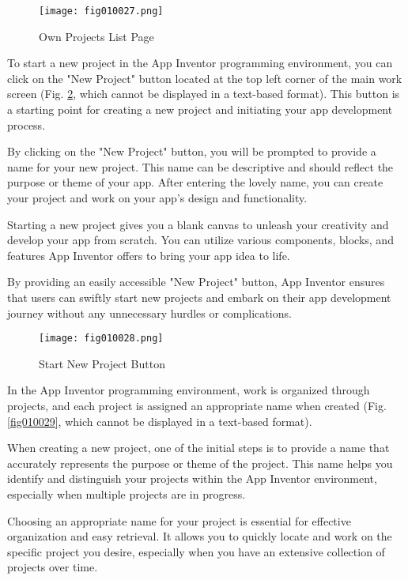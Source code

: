 \begin{figure}[H]
   \centering
   \texttt{[image: fig010027.png]}
   \caption{Own Projects List Page}
\label{fig010027}
\end{figure}

To start a new project in the App Inventor programming environment, you can click on the "New Project" button located at the top left corner of the main work screen (Fig. \ref{fig010028}, which cannot be displayed in a text-based format). This button is a starting point for creating a new project and initiating your app development process.

By clicking on the "New Project" button, you will be prompted to provide a name for your new project. This name can be descriptive and should reflect the purpose or theme of your app. After entering the lovely name, you can create your project and work on your app's design and functionality.

Starting a new project gives you a blank canvas to unleash your creativity and develop your app from scratch. You can utilize various components, blocks, and features App Inventor offers to bring your app idea to life.

By providing an easily accessible "New Project" button, App Inventor ensures that users can swiftly start new projects and embark on their app development journey without any unnecessary hurdles or complications.

\begin{figure}[H]
   \centering
   \texttt{[image: fig010028.png]}
   \caption{Start New Project Button}
\label{fig010028}
\end{figure}

In the App Inventor programming environment, work is organized through projects, and each project is assigned an appropriate name when created (Fig. \ref{fig010029}, which cannot be displayed in a text-based format).

When creating a new project, one of the initial steps is to provide a name that accurately represents the purpose or theme of the project. This name helps you identify and distinguish your projects within the App Inventor environment, especially when multiple projects are in progress.

Choosing an appropriate name for your project is essential for effective organization and easy retrieval. It allows you to quickly locate and work on the specific project you desire, especially when you have an extensive collection of projects over time.

